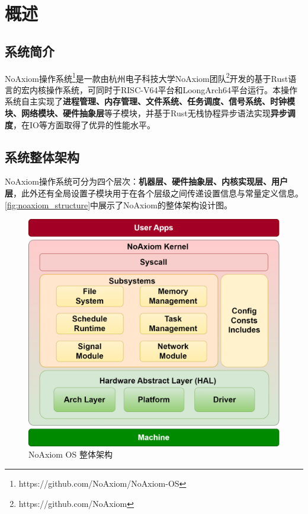 \documentclass{article}
\begin{document}
\renewcommand{\figurename}{图}
\renewcommand{\tablename}{表}
\renewcommand{\figureautorefname}{图}
\renewcommand{\tableautorefname}{表}
\renewcommand{\arraystretch}{0.9}

\newpage
\section{概述}
\subsection{系统简介}

NoAxiom操作系统\footnote{https://github.com/NoAxiom/NoAxiom-OS}是一款由杭州电子科技大学NoAxiom团队\footnote{https://github.com/NoAxiom}开发的基于Rust语言的宏内核操作系统，可同时于RISC-V64平台和LoongArch64平台运行。本操作系统自主实现了\textbf{进程管理、内存管理、文件系统、任务调度、信号系统、时钟模块、网络模块、硬件抽象层}等子模块，并基于Rust无栈协程异步语法实现\textbf{异步调度}，在IO等方面取得了优异的性能水平。

\subsection{系统整体架构}

NoAxiom操作系统可分为四个层次：\textbf{机器层、硬件抽象层、内核实现层、用户层}，此外还有全局设置子模块用于在各个层级之间传递设置信息与常量定义信息。\autoref{fig:noaxiom_structure}中展示了NoAxiom的整体架构设计图。

\begin{figure}[H]
    \centering
    \includegraphics[width=0.85\linewidth]{assets/brief/noaxiom_structure.drawio.png}
    \caption{NoAxiom OS 整体架构}
    \label{fig:noaxiom_structure}
\end{figure}
\end{document}
